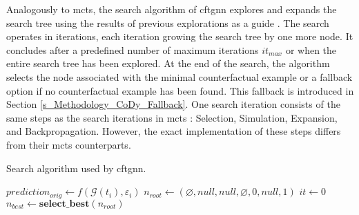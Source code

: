 Analogously to \gls{mcts}, the search algorithm of \gls{cftgnn} explores and expands the search tree using the results of previous explorations as a guide \cite{browne_survey_2012}. The search operates in iterations, each iteration growing the search tree by one more node. It concludes after a predefined number of maximum iterations $it_{max}$ or when the entire search tree has been explored. At the end of the search, the algorithm selects the node associated with the minimal counterfactual example or a fallback option if no counterfactual example has been found. This fallback is introduced in Section \ref{s_Methodology_CoDy_Fallback}. One search iteration consists of the same steps as the search iterations in \gls{mcts} \cite{browne_survey_2012}: Selection, Simulation, Expansion, and Backpropagation. However, the exact implementation of these steps differs from their \gls{mcts} counterparts.

{
\setlength{\algomargin}{1.25em}
\small
\begin{algorithm}[ht]
\caption{Search algorithm used by \gls{cftgnn}.}
\label{a_MCTS_Main}
    $prediction_{orig} \gets f(\mathcal{G}(t_i), \varepsilon_i)$\;
    $n_{root} \gets (\varnothing, null, null, \varnothing, 0, null, 1)$\;
    $it \gets 0$\;
    $n_{best} \gets \mathrm{\textbf{select\_best}}(n_{root})$\;
\end{algorithm}
}

